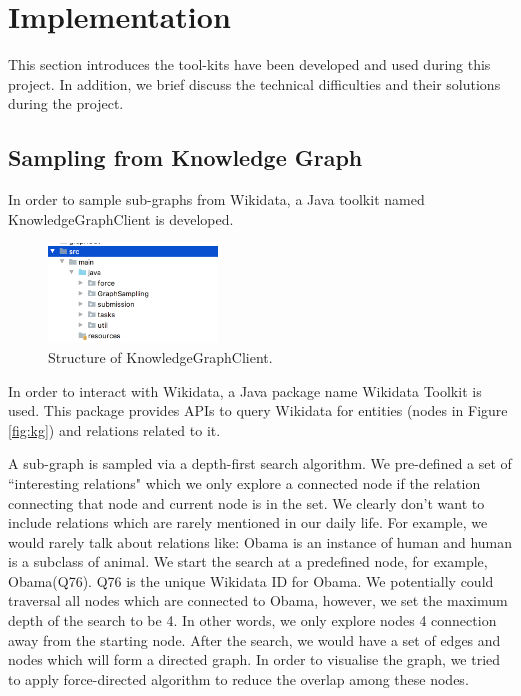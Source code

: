 \documentclass[bsc,frontabs,twoside,singlespacing,parskip,deptreport]{infthesis}     %
\begin{document}
\newpage
\section{Implementation}

This section introduces the tool-kits have been developed and used during this project. In addition, we brief discuss the technical difficulties and their solutions during the project.

\subsection{Sampling from Knowledge Graph}

In order to sample sub-graphs from Wikidata, a Java toolkit named KnowledgeGraphClient is developed.

\begin{figure}[h]
    \centering
    \includegraphics[width=0.4\textwidth]{client.png}
    \caption{Structure of KnowledgeGraphClient.}
    \label{fig:client}
\end{figure}

In order to interact with Wikidata, a Java package name Wikidata Toolkit\cite{wikitoolkit} is used. This package provides APIs to query Wikidata for entities (nodes in Figure \ref{fig:kg}) and relations related to it.

A sub-graph is sampled via a depth-first search algorithm. We pre-defined a set of ``interesting relations" which we only explore a connected node if the relation connecting that node and current node is in the set. We clearly don't want to include relations which are rarely mentioned in our daily life. For example, we would rarely talk about relations like: Obama is an instance of human and human is a subclass of animal. We start the search at a predefined node, for example, Obama(Q76). Q76 is the unique Wikidata ID for Obama. We potentially could traversal all nodes which are connected to Obama, however, we set the maximum depth of the search to be 4. In other words, we only explore nodes 4 connection away from the starting node. After the search, we would have a set of edges and nodes which will form a directed graph. In order to visualise the graph, we tried to apply force-directed algorithm to reduce the overlap among these nodes.
\end{document}
